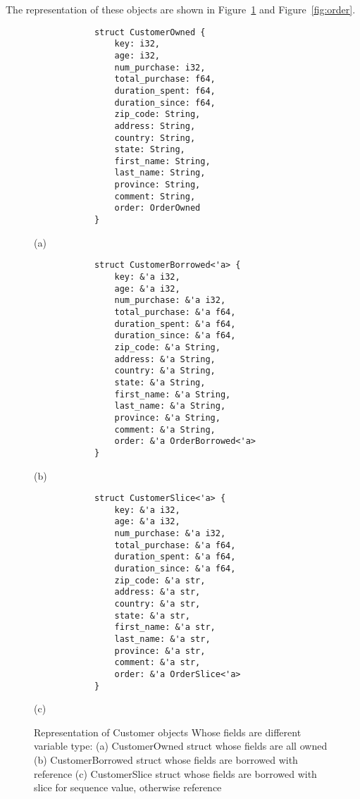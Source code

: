 The representation of these objects are shown in Figure~\ref{fig:customer} and Figure~\ref{fig:order}. 
\begin{figure}[htb]
    \begin{minipage}[t]{0.2\linewidth}\centering
        \begin{lstlisting}
            struct CustomerOwned {
                key: i32,
                age: i32,
                num_purchase: i32,
                total_purchase: f64,
                duration_spent: f64, 
                duration_since: f64,
                zip_code: String,
                address: String,
                country: String,
                state: String,
                first_name: String,
                last_name: String,
                province: String,
                comment: String, 
                order: OrderOwned
            }
        \end{lstlisting}
      \medskip
      \centerline{(a)}
    \end{minipage}\hfill
    \begin{minipage}[t]{0.6\linewidth}\centering
        \begin{lstlisting}
            struct CustomerBorrowed<'a> {
                key: &'a i32,
                age: &'a i32,
                num_purchase: &'a i32,
                total_purchase: &'a f64,
                duration_spent: &'a f64, 
                duration_since: &'a f64,
                zip_code: &'a String,
                address: &'a String,
                country: &'a String,
                state: &'a String,
                first_name: &'a String,
                last_name: &'a String,
                province: &'a String,
                comment: &'a String, 
                order: &'a OrderBorrowed<'a>
            }
        \end{lstlisting}
      \medskip
      \centerline{(b)}
    \end{minipage}
    \begin{minipage}[t]{0.2\linewidth}\centering
        \begin{lstlisting}
            struct CustomerSlice<'a> {
                key: &'a i32,
                age: &'a i32,
                num_purchase: &'a i32,
                total_purchase: &'a f64,
                duration_spent: &'a f64, 
                duration_since: &'a f64,
                zip_code: &'a str,
                address: &'a str,
                country: &'a str, 
                state: &'a str,
                first_name: &'a str,
                last_name: &'a str,
                province: &'a str,
                comment: &'a str,
                order: &'a OrderSlice<'a>
            }
        \end{lstlisting}
      \medskip
      \centerline{(c)}
    \end{minipage}\hfill
    \caption{Representation of Customer objects Whose fields are different variable type: (a) CustomerOwned struct whose fields are all owned 
    (b) CustomerBorrowed struct whose fields are borrowed with reference (c) CustomerSlice struct whose fields are borrowed with slice for sequence value, otherwise reference}
    \label{fig:customer}
 \end{figure}

